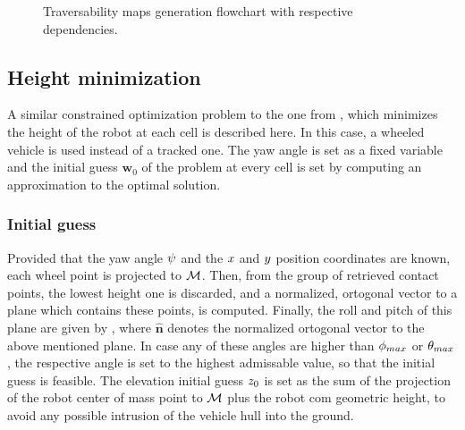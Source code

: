 \begin{figure}[h]
\centering
{}
\caption[Traversability maps generation flowchart.]{Traversability maps generation flowchart with respective dependencies.}
\label{fig:travmapsgenerationflowchart}
\end{figure}

\subsection{Height minimization}
\label{subsection:heightMinimization}

A similar constrained optimization problem to the one from \cite{Amorim2014}, which minimizes the height of the robot at each cell is described here. In this case, a wheeled vehicle is used instead of a tracked one. The yaw angle is set as a fixed variable and the initial guess $\boldsymbol{w}_0$ of the problem at every cell is set by computing an  approximation to the optimal solution.

\subsubsection*{Initial guess}

Provided that the yaw angle $\psi$ and the $x$ and $y$ position coordinates are known, each wheel point is projected to $\mathcal{M}$. Then, from the group of retrieved contact points, the lowest height one is discarded, and a normalized, ortogonal vector to a plane which contains these points, is computed. Finally, the roll and pitch of this plane are given by , where $\mathbf{\hat{n}}$ denotes the normalized ortogonal vector to the above mentioned plane. In case any of these angles are higher than $\phi_{max}$ or $\theta_{max}$, the respective angle is set to the highest admissable value, so that the initial guess is feasible. The elevation initial guess $z_0$ is set as the sum of the projection of the robot center of mass point to $\mathcal{M}$ plus the robot \acrshort{com} geometric height, to avoid any possible intrusion of the vehicle hull into the ground.

